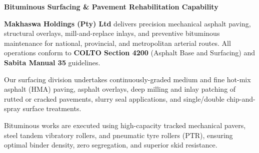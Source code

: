 \hypertarget{sec:asphalt}{}

\noindent
\begin{minipage}[t]{0.62\textwidth}
    \vspace{0pt}
    {\large\bfseries\color{mhnavy} Bituminous Surfacing \& Pavement Rehabilitation Capability}
    \vspace{0.12cm}

    {\fontsize{9pt}{13pt}\selectfont\color{mhtext}
    \textbf{Makhaswa Holdings (Pty) Ltd} delivers precision mechanical asphalt paving, structural overlays, mill-and-replace inlays, and preventive bituminous maintenance for national, provincial, and metropolitan arterial routes. All operations conform to \textbf{COLTO Section 4200} (Asphalt Base and Surfacing) and \textbf{Sabita Manual 35} guidelines.
    }

    \vspace{0.22cm}

    {\fontsize{9pt}{13pt}\selectfont\color{mhtext}
    Our surfacing division undertakes continuously-graded medium and fine hot-mix asphalt (HMA) paving, asphalt overlays, deep milling and inlay patching of rutted or cracked pavements, slurry seal applications, and single/double chip-and-spray surface treatments.
    }

    \vspace{0.22cm}

    {\fontsize{9pt}{13pt}\selectfont\color{mhtext}
    Bituminous works are executed using high-capacity tracked mechanical pavers, steel tandem vibratory rollers, and pneumatic tyre rollers (PTR), ensuring optimal binder density, zero segregation, and superior skid resistance.
    }
\end{minipage}
\hfill
